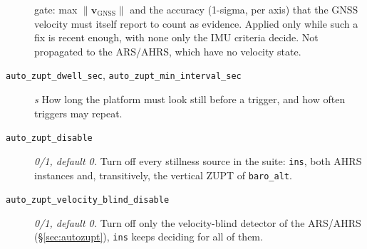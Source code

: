 \documentclass[11pt,a4paper]{article}
\newcommand{\vect}[1]{\bm{#1}}
\newcommand{\code}[1]{\texttt{#1}}
\begin{document}
\begin{description}
    gate: max $\|\vect{v}_{\text{GNSS}}\|$ and the accuracy (1-sigma,
    per axis) that the GNSS velocity must itself report to count as
    evidence. Applied only while such a fix is recent enough, with
    none only the IMU criteria decide. Not propagated to the ARS/AHRS,
    which have no velocity state.
  \item[\code{auto\_\allowbreak{}zupt\_\allowbreak{}dwell\_\allowbreak{}sec},
    \code{auto\_\allowbreak{}zupt\_\allowbreak{}min\_\allowbreak{}interval\_\allowbreak{}sec}] \emph{s} How long the
    platform must look still before a trigger, and how often triggers
    may repeat.
  \item[\code{auto\_\allowbreak{}zupt\_\allowbreak{}disable}] \emph{0/1, default 0.} Turn off
    every stillness source in the suite: \code{ins}, both AHRS
    instances and, transitively, the vertical ZUPT of \code{baro\_\allowbreak{}alt}.
  \item[\code{auto\_\allowbreak{}zupt\_\allowbreak{}velocity\_\allowbreak{}blind\_\allowbreak{}disable}] \emph{0/1, default
    0.} Turn off only the velocity-blind detector of the ARS/AHRS
    (\S\ref{sec:autozupt}), \code{ins} keeps deciding for all of them.
\end{description}
\end{document}
